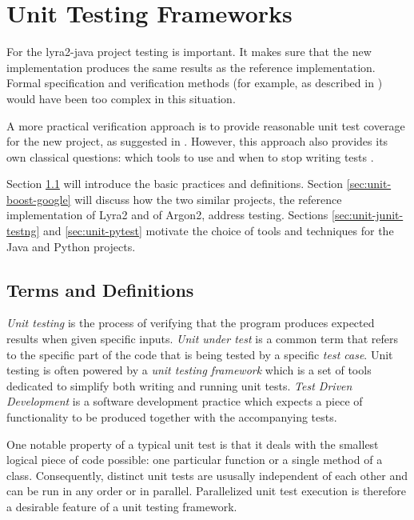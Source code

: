 \chapter{Unit Testing Frameworks}
\label{chapter:unit-testing-framework}

For the lyra2-java project testing is important. It makes sure that the new implementation produces the same results as the reference implementation. Formal specification and verification methods (for example, as described in \cite{lamsweerde:2000:formal-specification, mueller:1994:formal-specification}) would have been too complex in this situation.

A more practical verification approach is to provide reasonable unit test coverage for the new project, as suggested in \cite{williams:2010:unit-tests-rock}. However, this approach also provides its own classical questions: which tools to use \cite{daka:2014:unit-testing-tools} and when to stop writing tests \cite{elberzhager:2012:reducing-effort}.

Section \ref{sec:unit-terms-and-definitions} will introduce the basic practices and definitions. Section \ref{sec:unit-boost-google} will discuss how the two similar projects, the reference implementation of Lyra2 and of Argon2, address testing. Sections \ref{sec:unit-junit-testng} and \ref{sec:unit-pytest} motivate the choice of tools and techniques for the Java and Python projects.

\section{Terms and Definitions}
\label{sec:unit-terms-and-definitions}

\emph{Unit testing} is the process of verifying that the program produces expected results when given specific inputs. \emph{Unit under test} is a common term that refers to the specific part of the code that is being tested by a specific \emph{test case}. Unit testing is often powered by a \emph{unit testing framework} which is a set of tools dedicated to simplify both writing and running unit tests. \emph{Test Driven Development} is a software development practice which expects a piece of functionality to be produced together with the accompanying tests.

One notable property of a typical unit test is that it deals with the smallest logical piece of code possible: one particular function or a single method of a class. Consequently, distinct unit tests are ususally independent of each other and can be run in any order or in parallel. Parallelized unit test execution is therefore a desirable feature of a unit testing framework.

